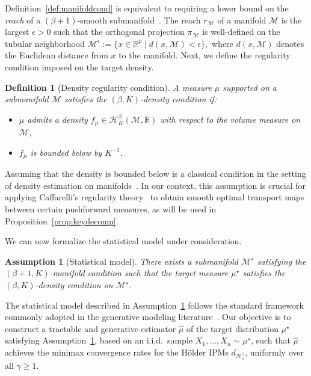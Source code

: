 \documentclass[10pt]{article}
\newtheorem{definition}{Definition}
\newtheorem{assumption}{Assumption}
\begin{document}
Definition~\ref{def:manifoldcond} is equivalent to requiring a lower bound on the \emph{reach} of a $(\beta+1)$-smooth submanifold~\citep{federer1959}. The reach $r_{\mathcal{M}}$ of a manifold $\mathcal{M}$ is the largest $\epsilon > 0$ such that the orthogonal projection $\pi_{\mathcal{M}}$ is well-defined on the tubular neighborhood
$
\mathcal{M}^\epsilon := \{x \in \mathbb{R}^p \mid d(x, \mathcal{M}) < \epsilon\},
$
where $d(x, \mathcal{M})$ denotes the Euclidean distance from $x$ to the manifold.
Next, we define the regularity condition imposed on the target density.

\begin{definition}[Density regularity condition]\label{def:densitycond}
    A measure $\mu$ supported on a submanifold $\mathcal{M}$ satisfies the $(\beta, K)$-density condition if:
    \begin{itemize}
        \item[i)] $\mu$ admits a density $f_\mu \in \mathcal{H}_K^\beta(\mathcal{M}, \mathbb{R})$ with respect to the volume measure on $\mathcal{M}$,
        \item[ii)] $f_\mu$ is bounded below by $K^{-1}$.
    \end{itemize}
\end{definition}
Assuming that the density is bounded below is a classical condition in the setting of density estimation on manifolds~\citep{divol2022measure, tang2023minimax}. In our context, this assumption is crucial for applying Caffarelli's regularity theory~\citep{villani2009optimal} to obtain smooth optimal transport maps between certain pushforward measures, as will be used in Proposition~\ref{prop:keydecomp}.

We can now formalize the statistical model under consideration.

\begin{assumption}[Statistical model]\label{assump:model}
There exists a submanifold $\mathcal{M}^\star$ satisfying the $(\beta+1, K)$-manifold condition such that the target measure $\mu^\star$ satisfies the $(\beta, K)$-density condition on $\mathcal{M}^\star$.
\end{assumption}

The statistical model described in Assumption~\ref{assump:model} follows the standard framework commonly adopted in the generative modeling literature~\citep{divol2022measure, tang2023minimax, azangulov2024convergence}. Our objective is to construct a tractable and generative estimator $\hat{\mu}$ of the target distribution $\mu^\star$ satisfying Assumption~\ref{assump:model}, based on an i.i.d.\ sample $X_1, \dots, X_n \sim \mu^\star$, such that $\hat{\mu}$ achieves the minimax convergence rates for the Hölder IPMs $d_{\mathcal{H}^\gamma_1}$, uniformly over all $\gamma \geq 1$. 
\end{document}
